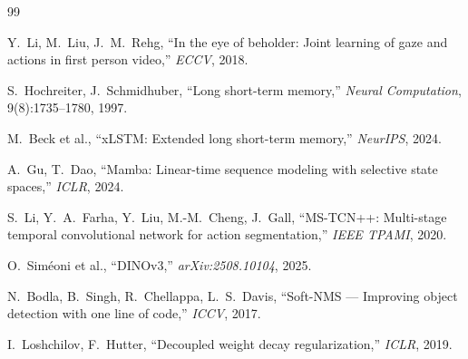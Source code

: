 \documentclass[12pt, a4paper]{article}
\begin{document}

\begin{thebibliography}{99}

Y.~Li, M.~Liu, J.~M.~Rehg,
``In the eye of beholder: Joint learning of gaze and actions in first person video,''
\textit{ECCV}, 2018.

S.~Hochreiter, J.~Schmidhuber,
``Long short-term memory,''
\textit{Neural Computation}, 9(8):1735--1780, 1997.

M.~Beck et al.,
``xLSTM: Extended long short-term memory,''
\textit{NeurIPS}, 2024.

A.~Gu, T.~Dao,
``Mamba: Linear-time sequence modeling with selective state spaces,''
\textit{ICLR}, 2024.

S.~Li, Y.~A.~Farha, Y.~Liu, M.-M.~Cheng, J.~Gall,
``MS-TCN++: Multi-stage temporal convolutional network for action segmentation,''
\textit{IEEE TPAMI}, 2020.

O.~Sim\'eoni et al.,
``DINOv3,''
\textit{arXiv:2508.10104}, 2025.

N.~Bodla, B.~Singh, R.~Chellappa, L.~S.~Davis,
``Soft-NMS --- Improving object detection with one line of code,''
\textit{ICCV}, 2017.

I.~Loshchilov, F.~Hutter,
``Decoupled weight decay regularization,''
\textit{ICLR}, 2019.

\end{thebibliography}
\end{document}
